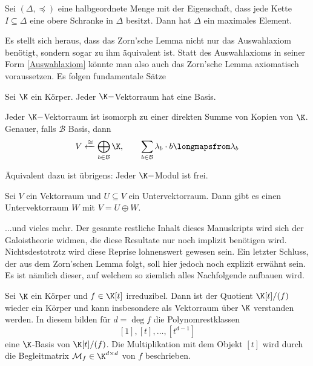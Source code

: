 \documentclass[11pt, a4paper]{article}
\begin{document}
\begin{theorem} \Theorem
    Sei $(\Delta, \preceq)$ eine halbgeordnete Menge mit der Eigenschaft, dass jede Kette $I \subseteq \Delta$ eine obere Schranke in $\Delta$ besitzt. Dann hat $\Delta$ ein maximales Element.
\end{theorem}

\begin{note}
    Es stellt sich heraus, dass das Zorn'sche Lemma nicht nur das Auswahlaxiom benötigt, sondern sogar zu ihm äquivalent ist. Statt des Auswahlaxioms in seiner Form \ref{Auswahlaxiom} könnte man also auch das Zorn'sche Lemma axiomatisch voraussetzen. Es folgen fundamentale Sätze
\end{note}

\begin{corollary}[Hamel] \Theorem Sei $\K$ ein Körper. Jeder $\K-$Vektorraum hat eine Basis.
\end{corollary}

\begin{corollary} Jeder $\K-$Vektorraum ist isomorph zu einer direkten Summe von Kopien von $\K$. Genauer, falls $\mathcal B$ Basis, dann 
$$V \xleftarrow{\cong}\bigoplus_{b\in \mathcal B} \K, \qquad \sum_{b\in \mathcal B} \lambda _b \cdot b \longmapsfrom \lambda_b$$
\end{corollary}

\begin{note}
    Äquivalent dazu ist übrigens: Jeder $\K-$Modul ist frei.
\end{note}

\begin{corollary}
    Sei $V$ ein Vektorraum und $U \subseteq V$ ein Untervektorraum. Dann gibt es einen Untervektorraum $W$ mit $V = U \oplus W$.
\end{corollary}

...und vieles mehr. Der gesamte restliche Inhalt dieses Manuskripts wird sich der Galoistheorie widmen, die diese Resultate nur noch implizit benötigen wird. Nichtsdestotrotz wird diese Reprise lohnenswert gewesen sein. Ein letzter Schluss, der aus dem Zorn'schen Lemma folgt, soll hier jedoch noch explizit erwähnt sein. Es ist nämlich dieser, auf welchem so ziemlich alles Nachfolgende aufbauen wird.

\begin{lemma}
    Sei $\K$ ein Körper und $f\in \K[t]$ irreduzibel. Dann ist der Quotient $\K[t]/(f)$ wieder ein Körper und kann insbesondere als Vektorraum über $\K$ verstanden werden. In diesem bilden für $d=\deg f$ die Polynomrestklassen
    $$[1], [t],\dots , [t^{d-1}]$$
    eine $\K$-Basis von $\K[t]/(f)$. Die Multiplikation mit dem Objekt $[t]$ wird durch die Begleitmatrix $\mathcal M_f\in \K^{d\times d}$ von $f$ beschrieben.
\end{lemma}
\end{document}
